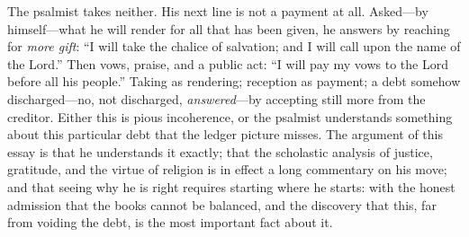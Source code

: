 The psalmist takes neither. His next line is not a payment at all. Asked---by himself---what he will render for all that has been given, he answers by reaching for \emph{more gift}: ``I will take the chalice of salvation; and I will call upon the name of the Lord.'' Then vows, praise, and a public act: ``I will pay my vows to the Lord before all his people.'' Taking as rendering; reception as payment; a debt somehow discharged---no, not discharged, \emph{answered}---by accepting still more from the creditor. Either this is pious incoherence, or the psalmist understands something about this particular debt that the ledger picture misses. The argument of this essay is that he understands it exactly; that the scholastic analysis of justice, gratitude, and the virtue of religion is in effect a long commentary on his move; and that seeing why he is right requires starting where he starts: with the honest admission that the books cannot be balanced, and the discovery that this, far from voiding the debt, is the most important fact about it.

